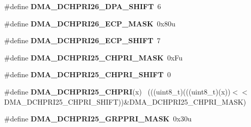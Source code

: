 \begin{DoxyCompactItemize}
\item 
\hypertarget{group___d_m_a___register___masks_ga81793951625beb8517af89024f49b106}{}\#define {\bfseries D\+M\+A\+\_\+\+D\+C\+H\+P\+R\+I26\+\_\+\+D\+P\+A\+\_\+\+S\+H\+I\+F\+T}~6\label{group___d_m_a___register___masks_ga81793951625beb8517af89024f49b106}

\item 
\hypertarget{group___d_m_a___register___masks_ga1ae05e971298fbfe09ad6355f2c5c4d6}{}\#define {\bfseries D\+M\+A\+\_\+\+D\+C\+H\+P\+R\+I26\+\_\+\+E\+C\+P\+\_\+\+M\+A\+S\+K}~0x80u\label{group___d_m_a___register___masks_ga1ae05e971298fbfe09ad6355f2c5c4d6}

\item 
\hypertarget{group___d_m_a___register___masks_ga1988ed421e3fb098291d0c7811603939}{}\#define {\bfseries D\+M\+A\+\_\+\+D\+C\+H\+P\+R\+I26\+\_\+\+E\+C\+P\+\_\+\+S\+H\+I\+F\+T}~7\label{group___d_m_a___register___masks_ga1988ed421e3fb098291d0c7811603939}

\item 
\hypertarget{group___d_m_a___register___masks_gaf6f7c485261a9a01d8f5ca7e2cc4c5c4}{}\#define {\bfseries D\+M\+A\+\_\+\+D\+C\+H\+P\+R\+I25\+\_\+\+C\+H\+P\+R\+I\+\_\+\+M\+A\+S\+K}~0x\+Fu\label{group___d_m_a___register___masks_gaf6f7c485261a9a01d8f5ca7e2cc4c5c4}

\item 
\hypertarget{group___d_m_a___register___masks_ga828a8a9725129e2017a0dd65a953ac46}{}\#define {\bfseries D\+M\+A\+\_\+\+D\+C\+H\+P\+R\+I25\+\_\+\+C\+H\+P\+R\+I\+\_\+\+S\+H\+I\+F\+T}~0\label{group___d_m_a___register___masks_ga828a8a9725129e2017a0dd65a953ac46}

\item 
\hypertarget{group___d_m_a___register___masks_gac4a890de481a516a78b573852e374d61}{}\#define {\bfseries D\+M\+A\+\_\+\+D\+C\+H\+P\+R\+I25\+\_\+\+C\+H\+P\+R\+I}(x)                                    ~(((uint8\+\_\+t)(((uint8\+\_\+t)(x))$<$$<$D\+M\+A\+\_\+\+D\+C\+H\+P\+R\+I25\+\_\+\+C\+H\+P\+R\+I\+\_\+\+S\+H\+I\+F\+T))\&D\+M\+A\+\_\+\+D\+C\+H\+P\+R\+I25\+\_\+\+C\+H\+P\+R\+I\+\_\+\+M\+A\+S\+K)\label{group___d_m_a___register___masks_gac4a890de481a516a78b573852e374d61}

\item 
\hypertarget{group___d_m_a___register___masks_gace45525b1f3b3aac2dd8c052f23f53c3}{}\#define {\bfseries D\+M\+A\+\_\+\+D\+C\+H\+P\+R\+I25\+\_\+\+G\+R\+P\+P\+R\+I\+\_\+\+M\+A\+S\+K}~0x30u\label{group___d_m_a___register___masks_gace45525b1f3b3aac2dd8c052f23f53c3}


\end{DoxyCompactItemize}

